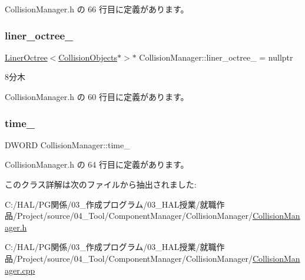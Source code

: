  Collision\+Manager.\+h の 66 行目に定義があります。

\mbox{\label{class_collision_manager_aa7e8919f4e8af9764106a26a0cfcf6a7}} 
\subsubsection{\texorpdfstring{liner\+\_\+octree\+\_\+}{liner\_octree\_}}
{\footnotesize\ttfamily \mbox{\hyperlink{class_liner_octree}{Liner\+Octree}}$<$\mbox{\hyperlink{class_collision_objects}{Collision\+Objects}}$\ast$$>$$\ast$ Collision\+Manager\+::liner\+\_\+octree\+\_\+ = nullptr\hspace{0.3cm}{\ttfamily [private]}}



8分木 



 Collision\+Manager.\+h の 60 行目に定義があります。

\mbox{\label{class_collision_manager_a6520ff69c7035e61267998885669d960}} 
\subsubsection{\texorpdfstring{time\+\_\+}{time\_}}
{\footnotesize\ttfamily D\+W\+O\+RD Collision\+Manager\+::time\+\_\+\hspace{0.3cm}{\ttfamily [private]}}



 Collision\+Manager.\+h の 64 行目に定義があります。



このクラス詳解は次のファイルから抽出されました\+:\begin{DoxyCompactItemize}
\item 
C\+:/\+H\+A\+L/\+P\+G関係/03\+\_\+作成プログラム/03\+\_\+\+H\+A\+L授業/就職作品/\+Project/source/04\+\_\+\+Tool/\+Component\+Manager/\+Collision\+Manager/\mbox{\hyperlink{_collision_manager_8h}{Collision\+Manager.\+h}}\item 
C\+:/\+H\+A\+L/\+P\+G関係/03\+\_\+作成プログラム/03\+\_\+\+H\+A\+L授業/就職作品/\+Project/source/04\+\_\+\+Tool/\+Component\+Manager/\+Collision\+Manager/\mbox{\hyperlink{_collision_manager_8cpp}{Collision\+Manager.\+cpp}}\end{DoxyCompactItemize}
